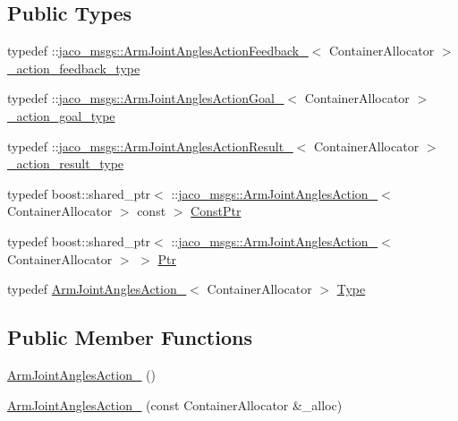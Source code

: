 \subsection*{Public Types}
\begin{DoxyCompactItemize}
\item 
typedef \+::\hyperlink{structjaco__msgs_1_1ArmJointAnglesActionFeedback__}{jaco\+\_\+msgs\+::\+Arm\+Joint\+Angles\+Action\+Feedback\+\_\+}$<$ Container\+Allocator $>$ \hyperlink{structjaco__msgs_1_1ArmJointAnglesAction___a18181acdd2f5776a83dd75f0b8a17d2a}{\+\_\+action\+\_\+feedback\+\_\+type}
\item 
typedef \+::\hyperlink{structjaco__msgs_1_1ArmJointAnglesActionGoal__}{jaco\+\_\+msgs\+::\+Arm\+Joint\+Angles\+Action\+Goal\+\_\+}$<$ Container\+Allocator $>$ \hyperlink{structjaco__msgs_1_1ArmJointAnglesAction___a096e56f63aae41aad15c7d8d5b5f6d0e}{\+\_\+action\+\_\+goal\+\_\+type}
\item 
typedef \+::\hyperlink{structjaco__msgs_1_1ArmJointAnglesActionResult__}{jaco\+\_\+msgs\+::\+Arm\+Joint\+Angles\+Action\+Result\+\_\+}$<$ Container\+Allocator $>$ \hyperlink{structjaco__msgs_1_1ArmJointAnglesAction___a24f1e437de783673dbbf81603f3e02a4}{\+\_\+action\+\_\+result\+\_\+type}
\item 
typedef boost\+::shared\+\_\+ptr$<$ \+::\hyperlink{structjaco__msgs_1_1ArmJointAnglesAction__}{jaco\+\_\+msgs\+::\+Arm\+Joint\+Angles\+Action\+\_\+}$<$ Container\+Allocator $>$ const  $>$ \hyperlink{structjaco__msgs_1_1ArmJointAnglesAction___a887ee408ca82f8192afc1d067521d3f5}{Const\+Ptr}
\item 
typedef boost\+::shared\+\_\+ptr$<$ \+::\hyperlink{structjaco__msgs_1_1ArmJointAnglesAction__}{jaco\+\_\+msgs\+::\+Arm\+Joint\+Angles\+Action\+\_\+}$<$ Container\+Allocator $>$ $>$ \hyperlink{structjaco__msgs_1_1ArmJointAnglesAction___a8b28d498c1ddae863fb41f6e398ade53}{Ptr}
\item 
typedef \hyperlink{structjaco__msgs_1_1ArmJointAnglesAction__}{Arm\+Joint\+Angles\+Action\+\_\+}$<$ Container\+Allocator $>$ \hyperlink{structjaco__msgs_1_1ArmJointAnglesAction___add1c0a2d3aef9fd47f39271e09ee6371}{Type}
\end{DoxyCompactItemize}
\subsection*{Public Member Functions}
\begin{DoxyCompactItemize}
\item 
\hyperlink{structjaco__msgs_1_1ArmJointAnglesAction___ad5d7a49f6aa3937bc54a22d391f85bd2}{Arm\+Joint\+Angles\+Action\+\_\+} ()
\item 
\hyperlink{structjaco__msgs_1_1ArmJointAnglesAction___acc16c1afa680bcf579d1e99787f3ff24}{Arm\+Joint\+Angles\+Action\+\_\+} (const Container\+Allocator \&\+\_\+alloc)
\end{DoxyCompactItemize}
